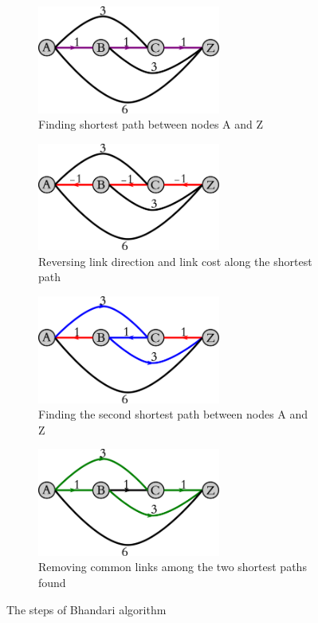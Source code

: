 \documentclass[10pt,letterpaper]{article}
\begin{document}
\begin{figure}[h]
\centering
\begin{subfigure}{0.49\textwidth}
\includegraphics[width=60mm]{bhandari_suurballe1_1}
\caption{
Finding shortest path between nodes A and Z
}
\end{subfigure}
\begin{subfigure}{0.49\textwidth}
\includegraphics[width=60mm]{bhandari_suurballe1_2}
\caption{
Reversing link direction and link cost along the shortest path
}
\end{subfigure}
\begin{subfigure}{0.49\textwidth}
\includegraphics[width=60mm]{bhandari_suurballe1_3}
\caption{
Finding the second shortest path between nodes A and Z
}
\end{subfigure}
\begin{subfigure}{0.49\textwidth}
\includegraphics[width=60mm]{bhandari_suurballe1_4}
\caption{
Removing common links among the two shortest paths found
}
\end{subfigure}
\caption{
The steps of Bhandari algorithm
}
\label{fig:bhandari}
\end{figure}
\end{document}
